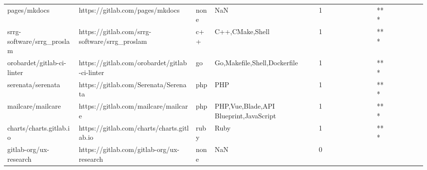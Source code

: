 \begin{tabular}{llllrlllllllllllll}
pages/mkdocs                                       &                    https://gitlab.com/pages/mkdocs &              none &                                                NaN &       1 &         &        &           &                &                 &        &           &       *** &          &          &       &              &          \\
srrg-software/srrg\_proslam                         &      https://gitlab.com/srrg-software/srrg\_proslam &               c++ &                                    C++,CMake,Shell &       1 &         &        &           &                &                 &        &           &       *** &          &          &       &              &          \\
orobardet/gitlab-ci-linter                         &      https://gitlab.com/orobardet/gitlab-ci-linter &                go &                       Go,Makefile,Shell,Dockerfile &       1 &         &        &           &                &                 &        &           &       *** &          &          &       &              &          \\
serenata/serenata                                  &               https://gitlab.com/Serenata/Serenata &               php &                                                PHP &       1 &         &        &           &                &                 &        &           &       *** &          &          &       &              &          \\
mailcare/mailcare                                  &               https://gitlab.com/mailcare/mailcare &               php &             PHP,Vue,Blade,API Blueprint,JavaScript &       1 &         &        &           &                &                 &        &           &       *** &          &          &       &              &          \\
charts/charts.gitlab.io                            &         https://gitlab.com/charts/charts.gitlab.io &              ruby &                                               Ruby &       1 &         &        &           &                &                 &        &           &       *** &          &          &       &              &          \\
gitlab-org/ux-research                             &          https://gitlab.com/gitlab-org/ux-research &              none &                                                NaN &       0 &         &        &           &                &                 &        &           &           &          &          &       &              &          \\

\end{tabular}
